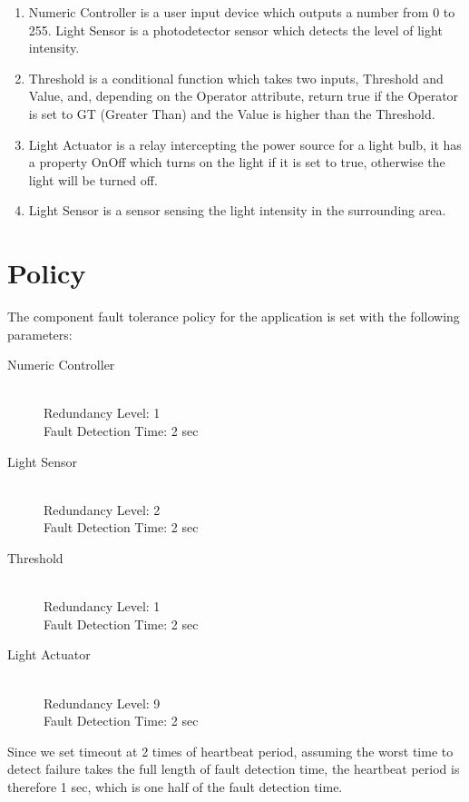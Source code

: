 \begin{enumerate}
\item Numeric Controller is a user input device which outputs
a number from 0 to 255. Light Sensor is a photodetector sensor which detects the
level of light intensity. 
\item Threshold is a conditional function which takes two
inputs, Threshold and Value, and, depending on the Operator attribute, return
true if the Operator is set to GT (Greater Than) and the Value is higher than
the Threshold. 
\item Light Actuator is a relay intercepting the power source for
a light bulb, it has a property OnOff which turns on the light if it is set to
true, otherwise the light will be turned off.
\item Light Sensor is a sensor sensing the light intensity in the surrounding
  area.
\end{enumerate}


\section{Policy}

The component fault tolerance policy for the application is set with the
following parameters:

\begin{description}
  \item[Numeric Controller] \hfill \\
    Redundancy Level: 1\\
    Fault Detection Time: 2 sec\\
  \item[Light Sensor] \hfill \\
    Redundancy Level: 2\\
    Fault Detection Time: 2 sec\\
  \item[Threshold] \hfill \\
    Redundancy Level: 1\\
    Fault Detection Time: 2 sec\\
  \item[Light Actuator] \hfill \\
    Redundancy Level: 9\\
    Fault Detection Time: 2 sec\\
\end{description}

Since we set timeout at 2 times of heartbeat period, assuming the worst time to detect
failure takes the full length of fault detection time, the heartbeat
period is therefore 1 sec, which is one half of the fault detection time.


